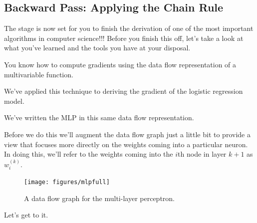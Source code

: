 \documentclass[assignment06_Solutions]{subfiles}
\begin{document}
\subsection{Backward Pass: Applying the Chain Rule}

The stage is now set for you to finish the derivation of one of the most important algorithms in computer science!!!  Before you finish this off, let's take a look at what you've learned and the tools you have at your disposal.
\be
\item You know how to compute gradients using the data flow representation of a multivariable function.
\item We've applied this technique to deriving the gradient of the logistic regression model.
\item We've written the MLP in this same data flow representation.
\ee

Before we do this we'll augment the data flow graph just a little bit to provide a view that focuses more directly on the weights coming into a particular neuron.  In doing this, we'll refer to the weights coming into the $i$th node in layer $k+1$ as $w^{(k)}_i$.

\begin{figure}
\begin{center}
\texttt{[image: figures/mlpfull]}
\end{center}
\caption{A data flow graph for the multi-layer perceptron.\label{fig:mlpgeneral}}
\end{figure}

Let's get to it.
\end{document}
